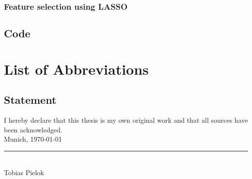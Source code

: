 \documentclass[12pt,letterpaper]{article}
\begin{document}
\subsubsection{Feature selection using LASSO}
\pagebreak
\subsection{Code}
\pagebreak

\pagestyle{fancy}

 

\nocite{*} 
\clearpage

\listoffigures
{}
\clearpage


\section*{List of Abbreviations}
\begin{multicols}{2}
  \begin{acronym}[abr]
  \end{acronym}
\end{multicols}



\pagebreak
\subsection*{Statement}
\label{erklaerung}
\vspace*{0.5cm}
I hereby declare that this thesis is my own original work and that all sources have been acknowledged.\\[1.0cm]
Munich, \today \\[2.0cm]
\rule{6.0cm}{0.4pt} \\
Tobias Pielok
\end{document}
